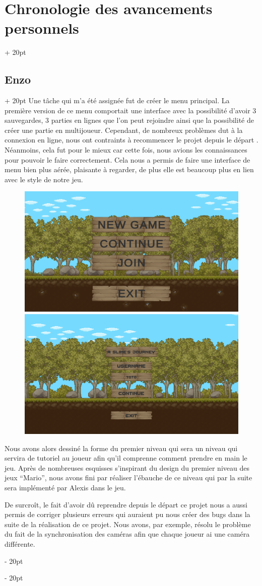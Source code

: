 \documentclass[a4paper, 12pt, twoside]{article}
\newcommand{\ind}[1][20pt]{\advance\leftskip + #1}
\newcommand{\deind}[1][20pt]{\advance\leftskip - #1}
\newenvironment{indt}[2][20pt]{#2 \par \ind[#1]}{\par \deind} %
\begin{document}
\begin{indt}{\section{Chronologie des avancements personnels}}
\begin{indt}{\subsection{Enzo}}
            Une tâche qui m'a été assignée fut de créer le menu principal. La première version de ce menu comportait une interface avec la possibilité d'avoir 3 sauvegardes, 3 parties en lignes que l'on peut rejoindre ainsi que la possibilité de créer une partie en multijoueur. Cependant, de nombreux problèmes dut à la connexion en ligne, nous ont contraints à recommencer le projet depuis le départ . Néanmoins, cela fut pour le mieux car cette fois, nous avions les connaissances pour pouvoir le faire correctement. Cela nous a permis de faire une interface de menu bien plus aérée, plaisante à regarder, de plus elle est beaucoup plus en lien avec le style de notre jeu.

            \begin{figure}
                \includegraphics[width=0.49\linewidth]{MMV11.png}\hfill \hfill\includegraphics[width=0.49\linewidth]{MMV21.png}
            \end{figure}

            Nous avons alors dessiné la forme du premier niveau qui sera un niveau qui servira de tutoriel au joueur afin qu'il comprenne comment prendre en main le jeu. Après de nombreuses esquisses s'inspirant du design du premier niveau des jeux “Mario”, nous avons fini par réaliser l'ébauche de ce niveau qui par la suite sera implémenté par Alexis dans le jeu.

            De surcroît, le fait d'avoir dû reprendre depuis le départ ce projet nous a aussi permis de corriger plusieurs erreurs qui auraient pu nous créer des bugs dans la suite de la réalisation de ce projet. Nous avons, par exemple, résolu le problème du fait de la synchronisation des caméras afin que chaque joueur ai une caméra différente.
        	

\end{indt}
\end{indt}
\end{document}
